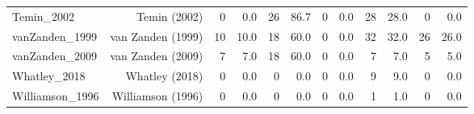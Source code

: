 \begin{table}[ht]
\begin{tabular}{lrrrrrrrrrrr}
Temin\_2002 & Temin (2002) & 0 & 0.0 & 26 & 86.7 & 0 & 0.0 & 28 & 28.0 & 0 & 0.0 \\
vanZanden\_1999 & van Zanden (1999) & 10 & 10.0 & 18 & 60.0 & 0 & 0.0 & 32 & 32.0 & 26 & 26.0 \\
vanZanden\_2009 & van Zanden (2009) & 7 & 7.0 & 18 & 60.0 & 0 & 0.0 & 7 & 7.0 & 5 & 5.0 \\
Whatley\_2018 & Whatley (2018) & 0 & 0.0 & 0 & 0.0 & 0 & 0.0 & 9 & 9.0 & 0 & 0.0 \\
Williamson\_1996 & Williamson (1996) & 0 & 0.0 & 0 & 0.0 & 0 & 0.0 & 1 & 1.0 & 0 & 0.0 \\
\bottomrule
\end{tabular}
\end{table}

